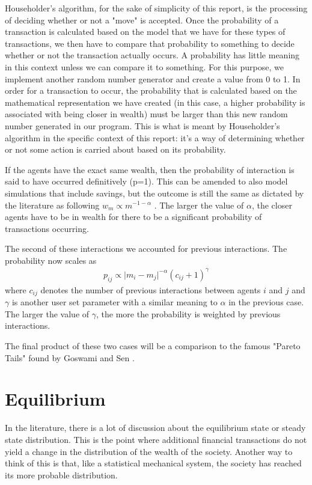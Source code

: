 \documentclass[11pt]{article}
\newcommand{\ba}{\[\begin{aligned}}
\newcommand{\ea}{\end{aligned}\]}
\begin{document}
	Householder's algorithm, for the sake of simplicity of this report, is the processing of deciding whether or not a "move" is accepted. Once the probability of a transaction is calculated based on the model that we have for these types of transactions, we then have to compare that probability to something to decide whether or not the transaction actually occurs. A probability has little meaning in this context unless we can compare it to something. For this purpose, we implement another random number generator and create a value from 0 to 1. In order for a transaction to occur, the probability that is calculated based on the mathematical representation we have created (in this case, a higher probability is associated with being closer in wealth) must be larger than this new random number generated in our program. This is what is meant by Householder's algorithm in the specific context of this report: it's a way of determining whether or not some action is carried about based on its probability. 
	
	If the agents have the exact same wealth, then the probability of interaction is said to have occurred definitively (p=1). This can be amended to also model simulations that include savings, but the outcome is still the same as dictated by the literature as following $w_m \propto m^{-1-\alpha}$ \cite{goswami}. The larger the value of $\alpha$, the closer agents have to be in wealth for there to be a significant probability of transactions occurring.
	
	The second of these interactions we accounted for previous interactions. The probability now scales as 
	\ba
	p_{ij} \propto \vert m_i-m_j\vert^{-\alpha}\left(c_{ij}+1\right)^{\gamma}
	\ea
	where $c_{ij}$ denotes the number of previous interactions between agents $i$ and $j$ and $\gamma$ is another user set parameter with a similar meaning to $\alpha$ in the previous case. The larger the value of $\gamma$, the more the probability is weighted by previous interactions.
	
	The final product of these two cases will be a comparison to the famous "Pareto Tails" found by Goswami and Sen \cite{goswami}. 
	
	\section{Equilibrium} 
	In the literature, there is a lot of discussion about the equilibrium state or steady state distribution. This is the point where additional financial transactions do not yield a change in the distribution of the wealth of the society. Another way to think of this is that, like a statistical mechanical system, the society has reached its more probable distribution.
	
\end{document}
